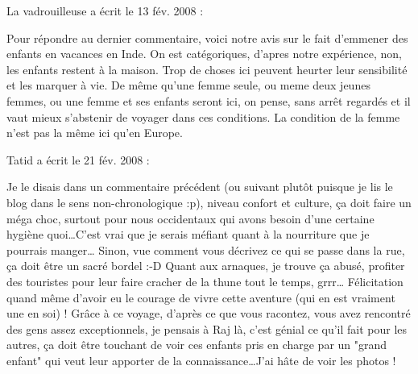 \medskip
La vadrouilleuse a écrit le 13 fév. 2008 :
\begin{displayquote}
Pour répondre au dernier commentaire, voici notre avis sur le fait d'emmener des enfants en vacances en Inde. On est catégoriques, d'apres notre expérience, non, les enfants restent à la maison. Trop de choses ici peuvent heurter leur sensibilité et les marquer à vie.
De même qu'une femme seule, ou meme deux jeunes femmes, ou une femme et ses enfants seront ici, on pense, sans arrêt regardés et il vaut mieux s'abstenir de voyager dans ces conditions. La condition de la femme n'est pas la même ici qu'en Europe.
\end{displayquote}

\medskip
Tatid a écrit le 21 fév. 2008 :
\begin{displayquote}
Je le disais dans un commentaire précédent (ou suivant plutôt puisque je lis le blog dans le sens non-chronologique :p), niveau confort et culture, ça doit faire un méga choc, surtout pour nous occidentaux qui avons besoin d'une certaine hygiène quoi\dots C'est vrai que je serais méfiant quant à la nourriture que je pourrais manger\dots
Sinon, vue comment vous décrivez ce qui se passe dans la rue, ça doit être un sacré bordel :-D Quant aux arnaques, je trouve ça abusé, profiter des touristes pour leur faire cracher de la thune tout le temps, grrr\dots
Félicitation quand même d'avoir eu le courage de vivre cette aventure (qui en est vraiment une en soi) !
Grâce à ce voyage, d'après ce que vous racontez, vous avez rencontré des gens assez exceptionnels, je pensais à Raj là, c'est génial ce qu'il fait pour les autres, ça doit être touchant de voir ces enfants pris en charge par un "grand enfant" qui veut leur apporter de la connaissance\dots J'ai hâte de voir les photos !
\end{displayquote}

\vfill
